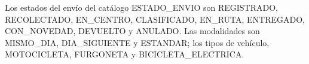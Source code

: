 
Los estados del envío del catálogo ESTADO\_ENVIO son REGISTRADO,
RECOLECTADO, EN\_CENTRO, CLASIFICADO, EN\_RUTA, ENTREGADO, CON\_NOVEDAD,
DEVUELTO y ANULADO. Las modalidades son MISMO\_DIA, DIA\_SIGUIENTE y
ESTANDAR; los tipos de vehículo, MOTOCICLETA, FURGONETA y
BICICLETA\_ELECTRICA.
